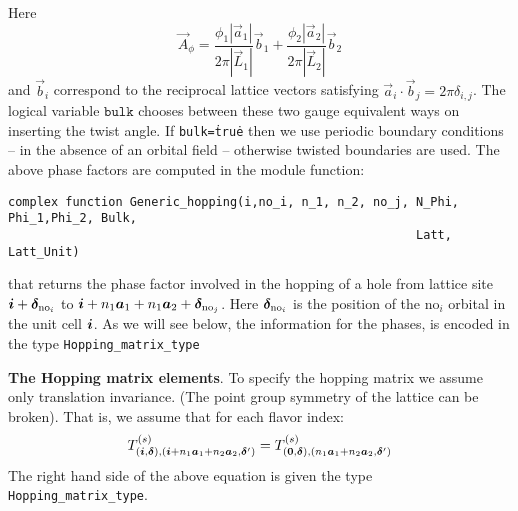 Here 
\begin{equation}
	\vec{A}_{\phi} =\frac{  \phi_1  |\vec{a}_1|} { 2 \pi |\vec{L}_1| } \vec{b}_1 +  \frac{  \phi_2  |\vec{a}_2|}{2 \pi  |\vec{L}_2| } \vec{b}_2
\end{equation}
and $\vec{b}_i$  correspond to the reciprocal lattice vectors satisfying  $ \vec{a}_i  \cdot  \vec{b}_j  = 2 \pi \delta_{i,j} $.   The logical variable $\texttt{bulk} $ chooses between these two  gauge equivalent ways  on inserting the twist angle. If \texttt{bulk=\.true\.}    then  we use periodic boundary conditions  --  in the absence of an orbital field -- otherwise  twisted boundaries are used.  
The above phase factors are computed  in the   module function: 
\begin{lstlisting}[style=fortran]
complex function Generic_hopping(i,no_i, n_1, n_2, no_j, N_Phi, Phi_1,Phi_2, Bulk, 
                                                         Latt, Latt_Unit)
\end{lstlisting}
that  returns the  phase factor involved in the hopping of a hole from lattice site $ \boldsymbol{i} + \boldsymbol{\delta}_{\text{no}_i} $ to 
$\boldsymbol{i} + n_1 \boldsymbol{a}_1 + n_1 \boldsymbol{a}_2+ \boldsymbol{\delta}_{\text{no}_j}  $.  Here  $\boldsymbol{\delta}_{\text{no}_i}$  is  the position of the $\text{no}_i$  orbital in the unit cell
$\boldsymbol{i}$. 
As  we will see below, the information for the phases,   is encoded in  the type \texttt{Hopping\_matrix\_type} 

\noindent
\textbf{The  Hopping matrix elements}. 
To specify the hopping matrix  we  assume  only translation invariance.  (The point group symmetry of the lattice can be broken).    That is, we assume that  for  each flavor index: 
\begin{equation} 
	 T_{(\boldsymbol{i},\boldsymbol{\delta}), (\boldsymbol{i} +  n_1\boldsymbol{a}_1  + n_2 \boldsymbol{a}_2,\boldsymbol{\delta}')}^{(s)}   =   T^{(s)}_{(\boldsymbol{0},\boldsymbol{\delta}),  (n_1\boldsymbol{a}_1  + n_2 \boldsymbol{a}_2,\boldsymbol{\delta}') }
\label{Hop.eq}	 
\end{equation}
The right  hand side of the above equation is given  the type  \texttt{Hopping\_matrix\_type}.



